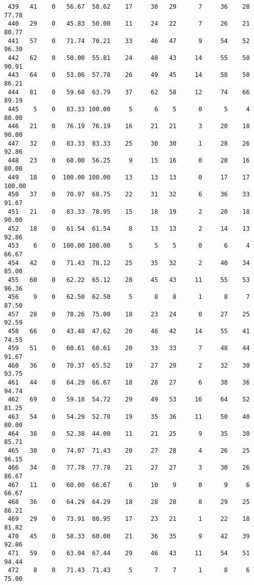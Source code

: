 \begin{verbatim}
 439   41    0   56.67  58.62    17     30   29      7     36    28    77.78
 440   29    0   45.83  50.00    11     24   22      7     26    21    80.77
 441   57    0   71.74  70.21    33     46   47      9     54    52    96.30
 442   62    0   50.00  55.81    24     48   43     14     55    50    90.91
 443   64    0   53.06  57.78    26     49   45     14     58    50    86.21
 444   81    0   59.68  63.79    37     62   58     12     74    66    89.19
 445    5    0   83.33 100.00     5      6    5      0      5     4    80.00
 446   21    0   76.19  76.19    16     21   21      3     20    18    90.00
 447   32    0   83.33  83.33    25     30   30      1     28    26    92.86
 448   23    0   60.00  56.25     9     15   16      0     20    16    80.00
 449   18    0  100.00 100.00    13     13   13      0     17    17   100.00
 450   37    0   70.97  68.75    22     31   32      6     36    33    91.67
 451   21    0   83.33  78.95    15     18   19      2     20    18    90.00
 452   18    0   61.54  61.54     8     13   13      2     14    13    92.86
 453    6    0  100.00 100.00     5      5    5      0      6     4    66.67
 454   42    0   71.43  78.12    25     35   32      2     40    34    85.00
 455   60    0   62.22  65.12    28     45   43     11     55    53    96.36
 456    9    0   62.50  62.50     5      8    8      1      8     7    87.50
 457   28    0   78.26  75.00    18     23   24      0     27    25    92.59
 458   66    0   43.48  47.62    20     46   42     14     55    41    74.55
 459   51    0   60.61  60.61    20     33   33      7     48    44    91.67
 460   36    0   70.37  65.52    19     27   29      2     32    30    93.75
 461   44    0   64.29  66.67    18     28   27      6     38    36    94.74
 462   69    0   59.18  54.72    29     49   53     16     64    52    81.25
 463   54    0   54.29  52.78    19     35   36     11     50    40    80.00
 464   38    0   52.38  44.00    11     21   25      9     35    30    85.71
 465   30    0   74.07  71.43    20     27   28      4     26    25    96.15
 466   34    0   77.78  77.78    21     27   27      3     30    26    86.67
 467   11    0   60.00  66.67     6     10    9      0      9     6    66.67
 468   36    0   64.29  64.29    18     28   28      8     29    25    86.21
 469   29    0   73.91  80.95    17     23   21      1     22    18    81.82
 470   45    0   58.33  60.00    21     36   35      9     42    39    92.86
 471   59    0   63.04  67.44    29     46   43     11     54    51    94.44
 472    8    0   71.43  71.43     5      7    7      1      8     6    75.00

\end{verbatim}
